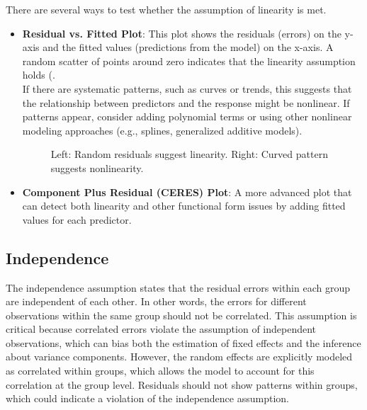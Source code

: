 There are several ways to test whether the assumption of linearity is met. 
\begin{itemize}
\item \textbf{Residual vs. Fitted Plot}: This plot shows the residuals (errors) on the y-axis and the fitted values (predictions from the model) on the x-axis. A random scatter of points around zero indicates that the linearity assumption holds (.\\

If there are systematic patterns, such as curves or trends, this suggests that the relationship between predictors and the response might be nonlinear. If patterns appear, consider adding polynomial terms or using other nonlinear modeling approaches (e.g., splines, generalized additive models).

\begin{figure}[ht]
\centering
{}
\caption{Left: Random residuals suggest linearity. Right: Curved pattern suggests nonlinearity.}
\end{figure}

\item \textbf{Component Plus Residual (CERES) Plot}:  A more advanced plot that can detect both linearity and other functional form issues by adding fitted values for each predictor.
\end{itemize}

\subsection*{Independence}
The independence assumption states that the residual errors within each group are independent of each other. In other words, the errors for different observations within the same group should not be correlated. This assumption is critical because correlated errors violate the assumption of independent observations, which can bias both the estimation of fixed effects and the inference about variance components. However, the random effects are explicitly modeled as correlated within groups, which allows the model to account for this correlation at the group level. Residuals should not show patterns within groups, which could indicate a violation of the independence assumption.

